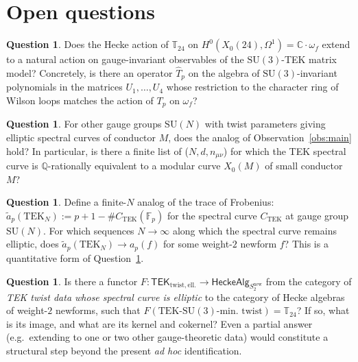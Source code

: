 \documentclass[11pt]{amsart}
\theoremstyle{definition}
\newtheorem{question}[theorem]{Question}
\theoremstyle{remark}
\newcommand{\Q}{\mathbb{Q}}
\newcommand{\C}{\mathbb{C}}
\newcommand{\F}{\mathbb{F}}
\newcommand{\SU}{\mathrm{SU}}
\newcommand{\TEK}{\mathrm{TEK}}
\begin{document}
\section{Open questions}\label{sec:questions}

\begin{question}\label{q:hecke-action}
Does the Hecke action of \(\mathbb{T}_{24}\) on
\(H^{0}(X_{0}(24), \Omega^{1}) = \C\cdot\omega_{f}\) extend to a
natural action on gauge-invariant observables of the
\(\SU(3)\)-TEK matrix model? Concretely, is there an operator
\(\hat T_{p}\) on the algebra of \(\SU(3)\)-invariant polynomials
in the matrices \(U_{1}, \dots, U_{4}\) whose restriction to the
character ring of Wilson loops matches the action of \(T_{p}\) on
\(\omega_{f}\)?
\end{question}

\begin{question}\label{q:other-levels}
For other gauge groups \(\SU(N)\) with twist parameters giving
elliptic spectral curves of conductor \(M\), does the analog of
Observation~\ref{obs:main} hold? In particular, is there a finite
list of (\(N, d, n_{\mu\nu}\)) for which the TEK spectral curve is
\(\Q\)-rationally equivalent to a modular curve \(X_{0}(M)\) of
small conductor \(M\)?
\end{question}

\begin{question}\label{q:finiteN}
Define a finite-\(N\) analog of the trace of Frobenius:
\(\widetilde{a}_{p}(\TEK_{N})
:= p + 1 - \#C_{\TEK}(\F_{p})\)
for the spectral curve \(C_{\TEK}\) at gauge group \(\SU(N)\). For
which sequences \(N \to \infty\) along which the spectral curve
remains elliptic, does
\(\widetilde{a}_{p}(\TEK_{N}) \to a_{p}(f)\) for some weight-\(2\)
newform \(f\)? This is a quantitative form of
Question~\ref{q:other-levels}.
\end{question}

\begin{question}\label{q:functor}
Is there a functor
\(F\colon \mathsf{TEK}_{\mathrm{twist}, \mathrm{ell.}} \longrightarrow
\mathsf{HeckeAlg}_{S_{2}^{\mathrm{new}}}\)
from the category of \emph{TEK twist data whose spectral curve is
elliptic} to the category of Hecke algebras of weight-\(2\)
newforms, such that \(F(\TEK\text{-}\SU(3)\text{-min.~twist}) =
\mathbb{T}_{24}\)? If so, what is its image, and what are its kernel
and cokernel? Even a partial answer (e.g.\ extending to one or two
other gauge-theoretic data) would constitute a structural step
beyond the present \emph{ad hoc} identification.
\end{question}
\end{document}
